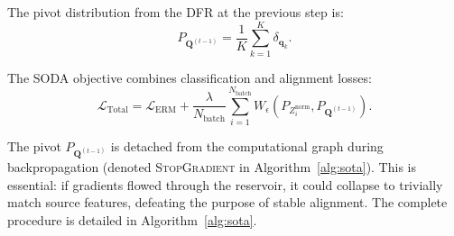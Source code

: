 The pivot distribution from the DFR at the previous step is:
\begin{equation}
    P_{\mathbf{Q}^{(t-1)}} = \frac{1}{K} \sum_{k=1}^{K} \delta_{\mathbf{q}_k}.
\end{equation}

The SODA objective combines classification and alignment losses:
\begin{equation}
    \label{eq:soda_final_objective}
    \mathcal{L}_{\text{Total}} = \mathcal{L}_{\text{ERM}} + \frac{\lambda}{N_{\text{batch}}} \sum_{i=1}^{N_{\text{batch}}} W_\epsilon\left(P_{Z_i^{\text{norm}}}, P_{\mathbf{Q}^{(t-1)}}\right).
\end{equation}

The pivot $P_{\mathbf{Q}^{(t-1)}}$ is detached from the computational graph during backpropagation (denoted \textsc{StopGradient} in Algorithm~\ref{alg:sota}). This is essential: if gradients flowed through the reservoir, it could collapse to trivially match source features, defeating the purpose of stable alignment. The complete procedure is detailed in Algorithm~\ref{alg:sota}.



